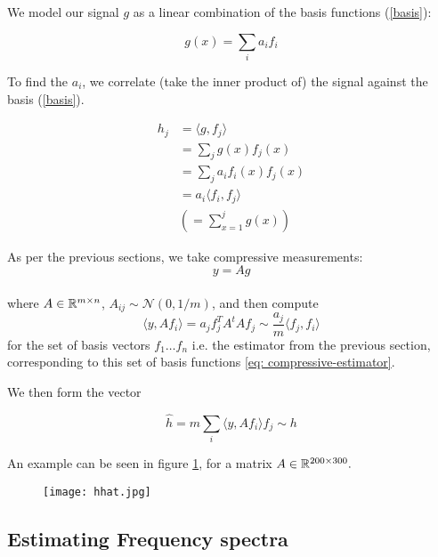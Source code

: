 We model our signal \(g\) as a linear combination of the basis functions (\ref{basis}):

\begin{equation}
g\left(x\right) = \sum_i a_i f_i 
\label{basis-expansion}
\end{equation}

To find the \(a_i\), we correlate (take the inner product of) the signal against the basis (\ref{basis}).

\begin{definition}
\begin{align}
h_j &= \langle g, f_j \rangle \\
&= \sum_j g\left(x\right) f_j\left(x\right) \\
&= \sum_j a_i f_i\left(x\right) f_j\left(x\right) \\
&= a_i \langle f_i, f_j\rangle \\
&\left(= \sum_{x=1}^j g\left(x\right)\right)
\end{align}
\end{definition}

As per the previous sections, we take compressive measurements:
\begin{equation}
y = Ag
\end{equation}
\\
where \(A \in {\mathbb{R}}^{m \times n} \), \(A_{ij} \sim \mathcal{N}\left(0,1/m\right)\), and then compute 
\begin{equation}
\langle y, Af_i\rangle = a_j  f_j^TA^tAf_j \sim \frac{a_j}{m} \langle f_j, f_i \rangle
\end{equation}
for the set of basis vectors \(f_1 \ldots f_n\) i.e. the estimator from the previous section, corresponding to this set of basis functions \eqref{eq: compressive-estimator}. 

We then form the vector 

\begin{equation}
\hat{h} = m \sum_i \langle y, Af_i\rangle f_j \sim h
\label{ss-estimator}
\end{equation}

An example can be seen in figure \ref{fig:hhat}, for a matrix \(A \in {\mathbb{R}}^{200 \times 300}.\)

\begin{figure}[h]
\centering
\texttt{[image: hhat.jpg]}
\caption{}
\label{fig:hhat}
\end{figure}

\subsection{Estimating Frequency spectra}

